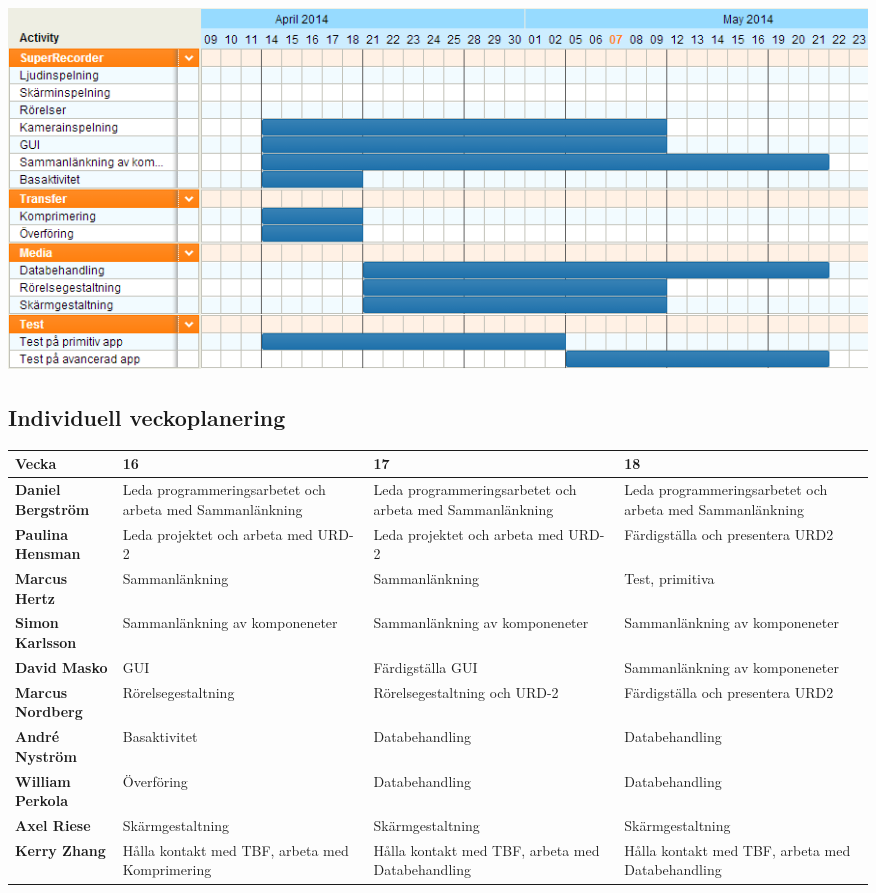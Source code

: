 \includegraphics[scale=0.5]{GANTT.png}

\subsection{Individuell veckoplanering}

\begin{tabular}{ | p{100pt} || p{100pt} | p{100pt} | p{100pt} |}
  \hline
  \textbf{Vecka} & 16 & 17 & 18\\ \hline
  \textbf{Daniel Bergström} & Leda programmeringsarbetet och arbeta med Sammanlänkning & Leda programmeringsarbetet och arbeta med Sammanlänkning & Leda programmeringsarbetet och arbeta med Sammanlänkning\\ \hline
  \textbf{Paulina Hensman} & Leda projektet och arbeta med URD-2 & Leda projektet och arbeta med URD-2 & Färdigställa och presentera URD2\\ \hline
  \textbf{Marcus Hertz} & Sammanlänkning & Sammanlänkning & Test, primitiva \\ \hline
  \textbf{Simon Karlsson} & Sammanlänkning av komponeneter & Sammanlänkning av komponeneter & Sammanlänkning av komponeneter\\ \hline
  \textbf{David Masko} & GUI & Färdigställa GUI & Sammanlänkning av komponeneter\\ \hline
  \textbf{Marcus Nordberg} & Rörelsegestaltning & Rörelsegestaltning och URD-2 & Färdigställa och presentera URD2\\ \hline
  \textbf{André Nyström} & Basaktivitet & Databehandling & Databehandling\\ \hline
  \textbf{William Perkola} & Överföring & Databehandling & Databehandling\\ \hline
  \textbf{Axel Riese} & Skärmgestaltning & Skärmgestaltning & Skärmgestaltning\\ \hline
  \textbf{Kerry Zhang} & Hålla kontakt med TBF, arbeta med Komprimering & Hålla kontakt med TBF, arbeta med Databehandling & Hålla kontakt med TBF, arbeta med Databehandling \\ \hline
\end{tabular}

